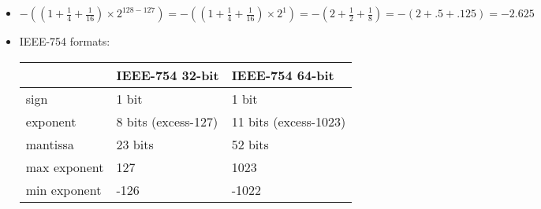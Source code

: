 \begin{itemize}
%
%
%
%
%
%
%
%

\item $-((1 + \frac{1}{4} + \frac{1}{16}) \times 2^{128-127}) = -((1 + \frac{1}{4} + \frac{1}{16}) \times 2^1) = -(2 + \frac{1}{2} + \frac{1}{8}) = -(2 + .5 + .125) = -2.625$

\item IEEE-754 formats: 

\begin{tabular}{|l|l|l|}
\hline
				& IEEE-754 32-bit	& IEEE-754 64-bit	\\
\hline
sign			& 1 bit				& 1 bit			\\
exponent		& 8 bits (excess-127)			& 11 bits (excess-1023)		\\
mantissa		& 23 bits			& 52 bits		\\
max exponent	& 127				& 1023			\\
min exponent	& -126				& -1022			\\
\hline
\end{tabular}


\end{itemize}
